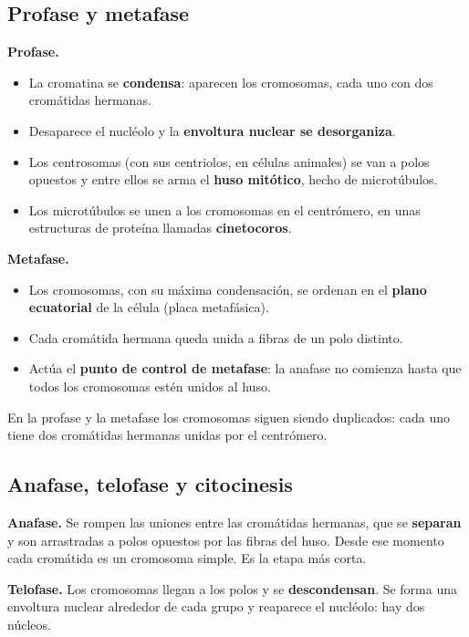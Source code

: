 \subsection{Profase y metafase}
\textbf{Profase.}

 
\begin{itemize}
  \item La cromatina se \textbf{condensa}: aparecen los cromosomas, cada uno con dos cromátidas hermanas.
  \item Desaparece el nucléolo y la \textbf{envoltura nuclear se desorganiza}.
  \item Los centrosomas (con sus centriolos, en células animales) se van a polos opuestos y entre ellos se arma el \textbf{huso mitótico}, hecho de microtúbulos.
  \item Los microtúbulos se unen a los cromosomas en el centrómero, en unas estructuras de proteína llamadas \textbf{cinetocoros}.
\end{itemize}
  

\textbf{Metafase.}

 
\begin{itemize}
  \item Los cromosomas, con su máxima condensación, se ordenan en el \textbf{plano ecuatorial} de la célula (placa metafásica).
  \item Cada cromátida hermana queda unida a fibras de un polo distinto.
  \item Actúa el \textbf{punto de control de metafase}: la anafase no comienza hasta que todos los cromosomas estén unidos al huso.
\end{itemize}
 
\begin{clave}[{Recuerda}] En la profase y la metafase los cromosomas siguen siendo duplicados: cada uno tiene dos cromátidas hermanas unidas por el centrómero.\end{clave}
\subsection{Anafase, telofase y citocinesis}
\textbf{Anafase.} Se rompen las uniones entre las cromátidas hermanas, que se \textbf{separan} y son arrastradas a polos opuestos por las fibras del huso. Desde ese momento cada cromátida es un cromosoma simple. Es la etapa más corta.

 

\textbf{Telofase.} Los cromosomas llegan a los polos y se \textbf{descondensan}. Se forma una envoltura nuclear alrededor de cada grupo y reaparece el nucléolo: hay dos núcleos.

